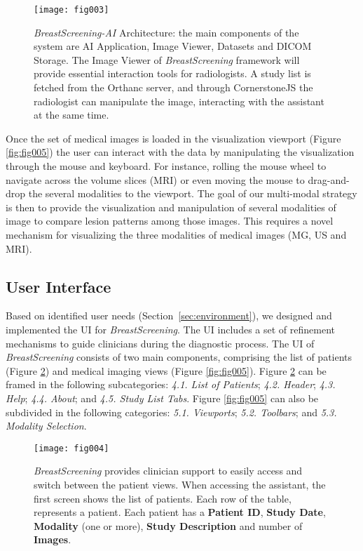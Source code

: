 \begin{figure}[htbp]
\centering
\texttt{[image: fig003]}
\caption{{\it BreastScreening-AI} Architecture: the main components of the system are AI Application, Image Viewer, Datasets and DICOM Storage. The Image Viewer of {\it BreastScreening} framework will provide essential interaction tools for radiologists. A study list is fetched from the Orthanc server, and through CornerstoneJS the radiologist can manipulate the image, interacting with the assistant at the same time.}
\label{fig:fig003}
\end{figure}

Once the set of medical images is loaded in the visualization viewport (Figure \ref{fig:fig005}) the user can interact with the data by manipulating the visualization through the mouse and keyboard.
For instance, rolling the mouse wheel to navigate across the volume slices (MRI) or even moving the mouse to drag-and-drop the several modalities to the viewport.
The goal of our multi-modal strategy is then to provide the visualization and manipulation of several modalities of image to compare lesion patterns among those images.
This requires a novel mechanism for visualizing the three modalities of medical images (MG, US and MRI).

\subsection{User Interface}

Based on identified user needs (Section~\ref{sec:environment}), we designed and implemented the UI for {\it BreastScreening}.
The UI includes a set of refinement mechanisms to guide clinicians during the diagnostic process.
The UI of {\it BreastScreening} consists of two main components, comprising the list of patients (Figure \ref{fig:fig004}) and medical imaging views (Figure \ref{fig:fig005}).
Figure \ref{fig:fig004} can be framed in the following subcategories:
{\it 4.1. List of Patients};
{\it 4.2. Header};
{\it 4.3. Help};
{\it 4.4. About}; and
{\it 4.5. Study List Tabs}.
Figure \ref{fig:fig005} can also be subdivided in the following categories:
{\it 5.1. Viewports};
{\it 5.2. Toolbars}; and
{\it 5.3. Modality Selection}.

\hfill
\begin{figure}[htbp]
\centering
\texttt{[image: fig004]}
\caption{{\it BreastScreening} provides clinician support to easily access and switch between the patient views. When accessing the assistant, the first screen shows the list of patients. Each row of the table, represents a patient. Each patient has a {\bf Patient ID}, {\bf Study Date}, {\bf Modality} (one or more), {\bf Study Description} and number of {\bf Images}.}
\label{fig:fig004}
\end{figure}
\hfill

